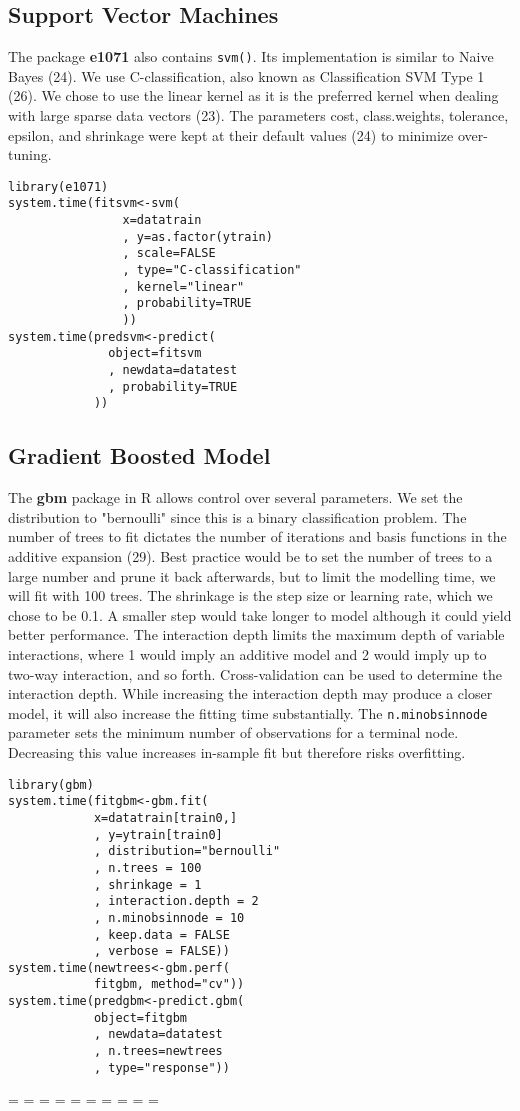 \documentclass[a4paper]{article}
\begin{document}
\begin{multicols}{2}
\subsection*{Support Vector Machines}
The package \textbf{e1071} also contains \texttt{svm()}. Its implementation is similar to Naive Bayes (24). We use C-classification, also known as Classification SVM Type 1 (26). We chose to use the linear kernel as it is the preferred kernel when dealing with large sparse data vectors (23). The parameters cost, class.weights, tolerance, epsilon, and shrinkage were kept at their default values (24) to minimize over-tuning.
\begin{verbatim}
library(e1071)
system.time(fitsvm<-svm(
                x=datatrain
                , y=as.factor(ytrain)
                , scale=FALSE
                , type="C-classification"
                , kernel="linear"
                , probability=TRUE
                ))
system.time(predsvm<-predict(
              object=fitsvm
              , newdata=datatest
              , probability=TRUE
            ))
\end{verbatim}

\subsection*{Gradient Boosted Model}
The \textbf{gbm} package in R allows control over several parameters. We set the distribution to "bernoulli" since this is a binary classification problem. The number of trees to fit dictates the number of iterations and basis functions in the additive expansion (29). Best practice would be to set the number of trees to a large number and prune it back afterwards, but to limit the modelling time, we will fit with 100 trees. The shrinkage is the step size or learning rate, which we chose to be 0.1. A smaller step would take longer to model although it could yield better performance. The interaction depth limits the maximum depth of variable interactions, where 1 would imply an additive model and 2 would imply up to two-way interaction, and so forth. Cross-validation can be used to determine the interaction depth. While increasing the interaction depth may produce a closer model, it will also increase the fitting time substantially. The \texttt{n.minobsinnode} parameter sets the minimum number of observations for a terminal node. Decreasing this value increases in-sample fit but therefore risks overfitting.
\begin{verbatim}
library(gbm)
system.time(fitgbm<-gbm.fit(
            x=datatrain[train0,]
            , y=ytrain[train0]
            , distribution="bernoulli"
            , n.trees = 100
            , shrinkage = 1
            , interaction.depth = 2
            , n.minobsinnode = 10
            , keep.data = FALSE
            , verbose = FALSE))
system.time(newtrees<-gbm.perf(
            fitgbm, method="cv"))
system.time(predgbm<-predict.gbm(
            object=fitgbm
            , newdata=datatest
            , n.trees=newtrees
            , type="response"))
\end{verbatim}
=
=
=
=
=
=
=
=
=
=

\end{multicols}
\end{document}
